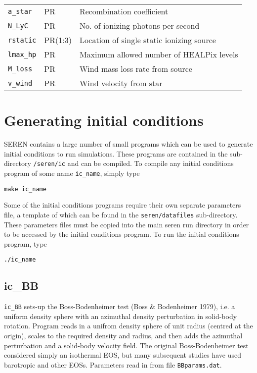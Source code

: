 \documentclass[a4paper]{article}
\newcommand{\NAME}{SEREN }
\newcommand{\name}{seren}
\newcommand{\var}[1]{\texttt{#1}}
\begin{document}
\begin{center}
\begin{supertabular}{|p{3cm}|p{2cm}|p{8cm}|}
\var{a\_star}        & PR       & Recombination coefficient \\
\var{N\_LyC}         & PR       & No. of ionizing photons per second \\
\var{rstatic}        & PR(1:3)  & Location of single static ionizing source \\
\var{lmax\_hp}       & PR       & Maximum allowed number of HEALPix levels \\
\var{M\_loss}        & PR       & Wind mass loss rate from source \\
\var{v\_wind}        & PR       & Wind velocity from star \\
\end{supertabular}
\end{center}
\vspace{1cm}


\newpage



\section{Generating initial conditions} \label{SS:ICS}
\NAME contains a large number of small programs which can be used to generate initial conditions to run simulations.  These programs are contained in the sub-directory \var{/\name/ic} and can be compiled.  To compile any initial conditions program of some name \var{ic\_name}, simply type \newline 

\var{make ic\_name} \newline

\noindent Some of the initial conditions programs require their own separate parameters file, a template of which can be found in the \var{\name/datafiles} sub-directory.  These parameters files must be copied into the main seren run directory in order to be accessed by the initial conditions program.  To run the initial conditions program, type \newline

\var{./ic\_name}


\subsection{ic\_BB}
\var{ic\_BB} sets-up the Boss-Bodenheimer test (Boss \& Bodenheimer 1979), i.e. a uniform density sphere with an azimuthal density perturbation in solid-body rotation.  Program reads in a unifrom density sphere of unit radius (centred at the origin), scales to the required density and radius, and then adds the azimuthal perturbation and a solid-body velocity field.  The original Boss-Bodenheimer test considered simply an isothermal EOS, but many subsequent studies have used barotropic and other EOSs.  Parameters read in from file \var{BBparams.dat}. \newline
\end{document}
